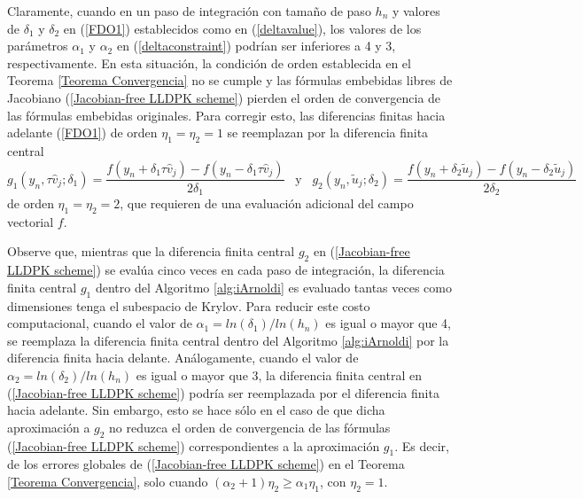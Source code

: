 Claramente, cuando en un paso de integración con tamaño de paso $h_n$ y valores de $\delta_1$ y $\delta_2$ en (\ref{FDO1}) establecidos como en (\ref{deltavalue}), los valores de los parámetros $ \alpha_1$ y $\alpha_2$ en (\ref{deltaconstraint}) podrían ser inferiores a 4 y 3, respectivamente. En esta situación, la condición de orden establecida en el Teorema \ref{Teorema Convergencia} no se cumple y las fórmulas embebidas libres de Jacobiano (\ref{Jacobian-free LLDPK scheme}) pierden el orden de convergencia de las fórmulas embebidas originales. Para corregir esto, las diferencias finitas hacia adelante (\ref{FDO1}) de orden $\eta_1=\eta_2=1$ se reemplazan por la diferencia finita central
\begin{equation*}
	g_1(y_n,\tau \widehat{v}_j;\delta_1)=\frac{f(y_n+\delta_1\tau \widehat{v}_j)-f(y_n-\delta_1\tau \widehat{v}_j)}{2\delta_1}  \;\;\; \text{y} \;\;\; g_2(y_n,\widetilde{u}_j;\delta_2)=\frac{f(y_n+\delta_2  \widetilde{u}_j)-f(y_n-\delta_2 \widetilde{u}_j)}{2\delta_2}
\end{equation*}
de orden $\eta_1=\eta_2=2$, que requieren de una evaluación adicional del campo vectorial $f$.

Observe que, mientras que la diferencia finita central $g_2$ en (\ref{Jacobian-free LLDPK scheme}) se evalúa cinco veces en cada paso de integración, la diferencia finita central $g_1$ dentro del Algoritmo \ref{alg:iArnoldi} es evaluado tantas veces como dimensiones tenga el subespacio de Krylov. Para reducir este costo computacional, cuando el valor de $\alpha_1=ln(\delta_1)/ln(h_n)$ es igual o mayor que 4, se reemplaza la diferencia finita central dentro del Algoritmo \ref{alg:iArnoldi} por la diferencia finita hacia delante. Análogamente, cuando el valor de $\alpha_2=ln(\delta_2)/ln(h_n)$ es igual o mayor que 3, la diferencia finita central en (\ref{Jacobian-free LLDPK scheme}) podría ser reemplazada por el diferencia finita hacia adelante. Sin embargo, esto se hace sólo en el caso de que dicha aproximación a $g_2$ no reduzca el orden de convergencia de las fórmulas (\ref{Jacobian-free LLDPK scheme}) correspondientes a la aproximación $g_1$. Es decir, de los errores globales de (\ref{Jacobian-free LLDPK scheme}) en el Teorema \ref{Teorema Convergencia}, solo cuando $(\alpha_2+1)\eta_2 \ge \alpha_1\eta_1$, con $\eta_2=1$.

